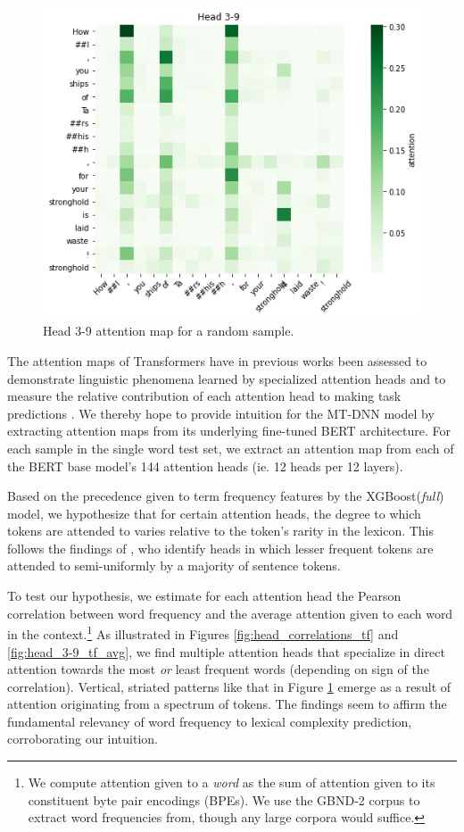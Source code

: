 \documentclass[11pt,a4paper]{article}
\begin{document}
\begin{figure}
  \centering
  \includegraphics[scale=0.45]{head_3-9.png}
  \captionsetup{justification=centering}
  \caption{\label{fig:head_3-9} Head 3-9 attention map for a random sample.}
\end{figure}

The attention maps of Transformers have in previous works been assessed to demonstrate linguistic phenomena learned by specialized attention heads \citep{1905-09418, 1906-04341} and to measure the relative contribution of each attention head to making task predictions \citep{1905-09418, 1905-10650}. We thereby hope to provide intuition for the MT-DNN model by extracting attention maps from its underlying fine-tuned BERT architecture. For each sample in the single word test set, we extract an attention map from each of the BERT base model's 144 attention heads (ie. 12 heads per 12 layers).

Based on the precedence given to term frequency features by the XGBoost(\textit{full}) model, we hypothesize that for certain attention heads, the degree to which tokens are attended to varies relative to the token's rarity in the lexicon. This follows the findings of \citealp{1905-09418}, who identify heads in which lesser frequent tokens are attended to semi-uniformly by a majority of sentence tokens. 

To test our hypothesis, we estimate for each attention head the Pearson correlation between word frequency and the average attention given to each word in the context.\footnote{We compute attention given to a \textit{word} as the sum of attention given to its constituent byte pair encodings (BPEs). We use the GBND-2 corpus to extract word frequencies from, though any large corpora would suffice.} As illustrated in Figures \ref{fig:head_correlations_tf} and \ref{fig:head_3-9_tf_avg}, we find multiple attention heads that specialize in direct attention towards the most \textit{or} least frequent words (depending on sign of the correlation). Vertical, striated patterns like that in Figure \ref{fig:head_3-9} emerge as a result of attention originating from a spectrum of tokens. The findings seem to affirm the fundamental relevancy of word frequency to lexical complexity prediction, corroborating our intuition.
\end{document}
